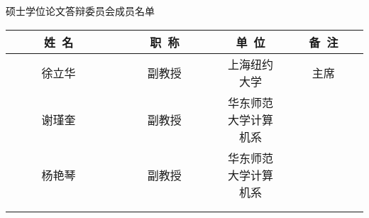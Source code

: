 \newpage
\thispagestyle{empty}
\vspace*{2em}

\begin{center}\STSong{}
 \underline{\makebox[4em][c]{\ccauthor}} 硕士学位论文答辩委员会成员名单
\end{center}

\begin{center}
\renewcommand{\arraystretch}{1.4}
\begin{tabular}{|c|c|c|c|} \hline
~~~~~姓~名~~~~~ & ~~~~~职~称~~~~~ & \hspace{6em}单~位\hspace{6em} & ~~~备~注~~~\\
\hline
  徐立华 & 副教授 & 上海纽约大学    & 主席  \\ \hline
  谢瑾奎 & 副教授 & 华东师范大学计算机系    &       \\ \hline
  杨艳琴 & 副教授 & 华东师范大学计算机系    &       \\ \hline
  &       &     &       \\ \hline
  &       &     &       \\ \hline
\end{tabular}
\end{center}
